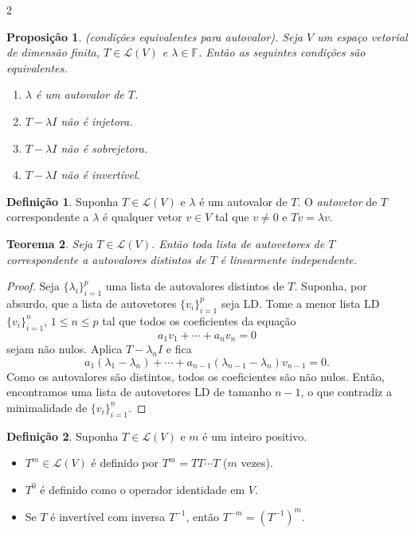 \documentclass{article}
\theoremstyle{plain}
\newtheorem{thm}{Teorema}[section]
\newtheorem{prop}[thm]{Proposição}
\theoremstyle{definition}
\newtheorem{defn}{Definição}[section]
\theoremstyle{remark}
\begin{document}
\begin{multicols}{2}
\begin{prop} (condições equivalentes para autovalor).
    Seja \(V\) um espaço vetorial de dimensão finita, \(T \in \mathcal{L}(V)\) e \(\lambda \in \mathbb{F}\). Então as seguintes condições são equivalentes.
    \begin{enumerate}
        \item[\textup{(a)}] \(\lambda\) é um autovalor de \(T\).
        \item[\textup{(b)}] \(T - \lambda I\) não é injetora.
        \item[\textup{(c)}] \(T - \lambda I\) não é sobrejetora.
        \item[\textup{(d)}] \(T - \lambda I\) não é invertível.
    \end{enumerate}
\end{prop}

\begin{defn}
    Suponha \(T \in \mathcal{L}(V)\) e \(\lambda\) é um autovalor de \(T\). O \emph{autovetor} de \(T\) correspondente a \(\lambda\) é qualquer vetor \(v \in V\) tal que \(v \neq 0\) e \(Tv = \lambda v\).
\end{defn}

\begin{thm}
    Seja \(T \in \mathcal{L}(V)\). Então toda lista de autovetores de \(T\) correspondente a autovalores distintos de \(T\) é linearmente independente.
\end{thm}

\begin{proof}
    Seja \(\{\lambda_i\}_{i=1}^p\) uma lista de autovalores distintos de \(T\). Suponha, por absurdo, que a lista de autovetores \(\{v_i\}_{i=1}^p\) seja LD. Tome a menor lista LD \(\{v_i\}_{i=1}^n\), \(1 \leq n \leq p\) tal que todos os coeficientes da equação 
    \[
        a_1 v_1 + \cdots + a_n v_n = 0
    \]
    \noindent sejam não nulos. Aplica \(T - \lambda_n I\) e fica 
    \[
        a_1 (\lambda_1 - \lambda_n) + \cdots + a_{n-1} (\lambda_{n-1} - \lambda_n)v_{n-1} = 0.
    \]
    Como os autovalores são distintos, todos os coeficientes são não nulos. Então, encontramos uma lista de autovetores LD de tamanho \(n-1\), o que contradiz a minimalidade de \(\{v_i\}_{i=1}^n\).
\end{proof}

\begin{defn}
    Suponha \(T \in \mathcal{L}(V)\) e \(m\) é um inteiro positivo.
    \begin{itemize}
        \item \(T^m \in \mathcal{L}(V)\) é definido por \(T^m = T T \cdots T\) (\(m\) vezes).
        \item \(T^0\) é definido como o operador identidade em \(V\).
        \item Se \(T\) é invertível com inversa \(T^{-1}\), então \(T^{-m} = (T^{-1})^m\).
    \end{itemize}
\end{defn}


\end{multicols}
\end{document}

